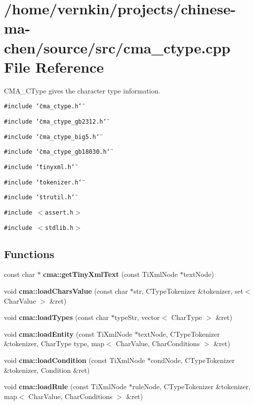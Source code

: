 \section{/home/vernkin/projects/chinese-ma-chen/source/src/cma\_\-ctype.cpp File Reference}
\label{cma__ctype_8cpp}
CMA\_\-CType gives the character type information.  


{\tt \#include \char`\"{}cma\_\-ctype.h\char`\"{}}\par
{\tt \#include \char`\"{}cma\_\-ctype\_\-gb2312.h\char`\"{}}\par
{\tt \#include \char`\"{}cma\_\-ctype\_\-big5.h\char`\"{}}\par
{\tt \#include \char`\"{}cma\_\-ctype\_\-gb18030.h\char`\"{}}\par
{\tt \#include \char`\"{}tinyxml.h\char`\"{}}\par
{\tt \#include \char`\"{}tokenizer.h\char`\"{}}\par
{\tt \#include \char`\"{}strutil.h\char`\"{}}\par
{\tt \#include $<$assert.h$>$}\par
{\tt \#include $<$stdlib.h$>$}\par
\subsection*{Functions}
\begin{CompactItemize}
\item 
const char $\ast$ \textbf{cma::getTinyXmlText} (const TiXmlNode $\ast$textNode)\label{namespacecma_9e262f7d98782e77249652852109952a}

\item 
void \textbf{cma::loadCharsValue} (const char $\ast$str, CTypeTokenizer \&tokenizer, set$<$ CharValue $>$ \&ret)\label{namespacecma_ab115ac8f5f6e8aa470f025bf114773b}

\item 
void {\bf cma::loadTypes} (const char $\ast$typeStr, vector$<$ CharType $>$ \&ret)
\item 
void \textbf{cma::loadEntity} (const TiXmlNode $\ast$textNode, CTypeTokenizer \&tokenizer, CharType type, map$<$ CharValue, CharConditions $>$ \&ret)\label{namespacecma_a633d17ab2db100f6da72cf5736f8d45}

\item 
void \textbf{cma::loadCondition} (const TiXmlNode $\ast$condNode, CTypeTokenizer \&tokenizer, Condition \&ret)\label{namespacecma_fc9de2d3ab1659aa8e628b95a490270e}

\item 
void \textbf{cma::loadRule} (const TiXmlNode $\ast$ruleNode, CTypeTokenizer \&tokenizer, map$<$ CharValue, CharConditions $>$ \&ret)\label{namespacecma_fa2a411436584a8e37139dffd9f44c1a}

\end{CompactItemize}


